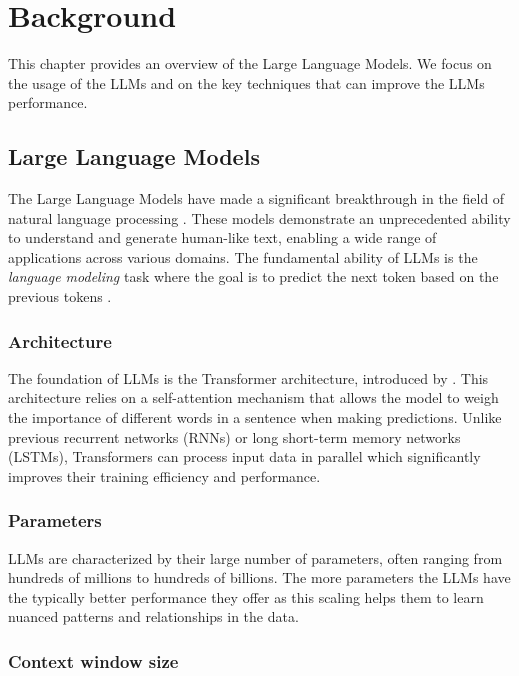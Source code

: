 \chapter{Background}
\label{chap:background}

This chapter provides an overview of the Large Language Models. We focus on the usage of the LLMs and on the key techniques that can improve the LLMs performance.


\section{Large Language Models}

The Large Language Models have made a significant breakthrough in the field of natural language processing \cite{Peters2018,Devlin2019,Brown2020}.
These models demonstrate an unprecedented ability to understand and generate human-like text, enabling a wide range of applications across various domains. The fundamental ability of LLMs is the \emph{language modeling} task where the goal is to predict the next token based on the previous tokens \cite{Bengio2000}.


\subsection{Architecture}

The foundation of LLMs is the Transformer architecture, introduced by \citet{Vaswani2017}. This architecture relies on a self-attention mechanism that allows the model to weigh the importance of different words in a sentence when making predictions. Unlike previous recurrent networks (RNNs) or long short-term memory networks (LSTMs), Transformers can process input data in parallel which significantly improves their training efficiency and performance.


\subsection{Parameters}

LLMs are characterized by their large number of parameters, often ranging from hundreds of millions to hundreds of billions. The more parameters the LLMs have the typically better performance they offer \cite{Kaplan2020} as this scaling helps them to learn nuanced patterns and relationships in the data.


\subsection{Context window size}

